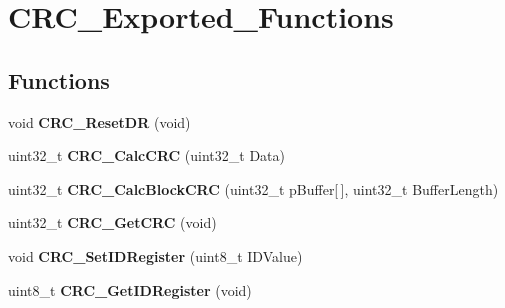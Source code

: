 \hypertarget{group__CRC__Exported__Functions}{
\section{CRC\_\-Exported\_\-Functions}
\label{group__CRC__Exported__Functions}
}
\subsection*{Functions}
\begin{DoxyCompactItemize}
\item 
\hypertarget{group__CRC__Exported__Functions_ga506467d5ef873a5a4ade4ae83cb110f6}{
void {\bfseries CRC\_\-ResetDR} (void)}
\label{group__CRC__Exported__Functions_ga506467d5ef873a5a4ade4ae83cb110f6}

\item 
\hypertarget{group__CRC__Exported__Functions_ga5407fdbb8e8c9be6322cc8856ae5db3b}{
uint32\_\-t {\bfseries CRC\_\-CalcCRC} (uint32\_\-t Data)}
\label{group__CRC__Exported__Functions_ga5407fdbb8e8c9be6322cc8856ae5db3b}

\item 
\hypertarget{group__CRC__Exported__Functions_gab15ebf620615c360048fb4f45b15fae6}{
uint32\_\-t {\bfseries CRC\_\-CalcBlockCRC} (uint32\_\-t pBuffer\mbox{[}$\,$\mbox{]}, uint32\_\-t BufferLength)}
\label{group__CRC__Exported__Functions_gab15ebf620615c360048fb4f45b15fae6}

\item 
\hypertarget{group__CRC__Exported__Functions_gab62db4561b0558f3c8ed53887fe7de8b}{
uint32\_\-t {\bfseries CRC\_\-GetCRC} (void)}
\label{group__CRC__Exported__Functions_gab62db4561b0558f3c8ed53887fe7de8b}

\item 
\hypertarget{group__CRC__Exported__Functions_ga769c9a42be57b972ae61bbada0f2e46a}{
void {\bfseries CRC\_\-SetIDRegister} (uint8\_\-t IDValue)}
\label{group__CRC__Exported__Functions_ga769c9a42be57b972ae61bbada0f2e46a}

\item 
\hypertarget{group__CRC__Exported__Functions_gaf869f6e9c3ca0ae0822cfad1abea7e5f}{
uint8\_\-t {\bfseries CRC\_\-GetIDRegister} (void)}
\label{group__CRC__Exported__Functions_gaf869f6e9c3ca0ae0822cfad1abea7e5f}

\end{DoxyCompactItemize}

